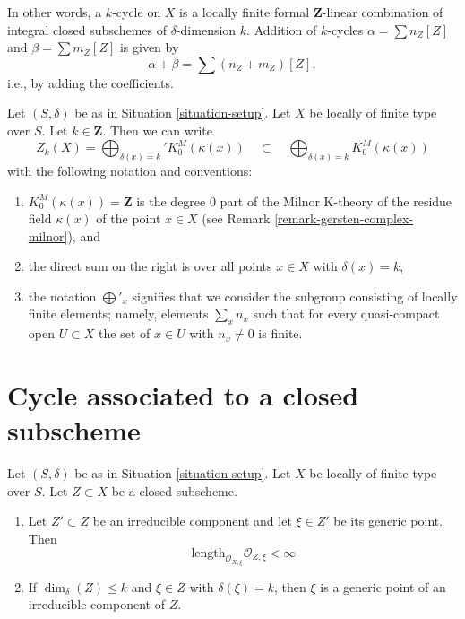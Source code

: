 \noindent
In other words, a $k$-cycle on $X$
is a locally finite formal $\mathbf{Z}$-linear
combination of integral closed subschemes of $\delta$-dimension $k$.
Addition of $k$-cycles $\alpha = \sum n_Z[Z]$ and
$\beta = \sum m_Z[Z]$ is given by
$$
\alpha + \beta = \sum (n_Z + m_Z)[Z],
$$
i.e., by adding the coefficients.

\begin{remark}
\label{remark-cycles-pointwise}
Let $(S, \delta)$ be as in Situation \ref{situation-setup}.
Let $X$ be locally of finite type over $S$. Let $k \in \mathbf{Z}$.
Then we can write
$$
Z_k(X) = \bigoplus\nolimits_{\delta(x) = k}' K_0^M(\kappa(x))
\quad\subset\quad
\bigoplus\nolimits_{\delta(x) = k} K_0^M(\kappa(x))
$$
with the following notation and conventions:
\begin{enumerate}
\item $K_0^M(\kappa(x)) = \mathbf{Z}$ is the degree $0$ part of
the Milnor K-theory of the residue field $\kappa(x)$ of the point
$x \in X$ (see Remark \ref{remark-gersten-complex-milnor}), and
\item the direct sum on the right is over all points $x \in X$
with $\delta(x) = k$,
\item the notation $\bigoplus'_x$ signifies that we consider the
subgroup consisting of locally finite elements; namely, elements
$\sum_x n_x$ such that for every quasi-compact open $U \subset X$
the set of $x \in U$ with $n_x \not = 0$ is finite.
\end{enumerate}
\end{remark}




\section{Cycle associated to a closed subscheme}
\label{section-cycle-of-closed-subscheme}

\begin{lemma}
\label{lemma-multiplicity-finite}
Let $(S, \delta)$ be as in Situation \ref{situation-setup}.
Let $X$ be locally of finite type over $S$.
Let $Z \subset X$ be a closed subscheme.
\begin{enumerate}
\item Let $Z' \subset Z$ be an irreducible component and
let $\xi \in Z'$ be its generic point.
Then
$$
\text{length}_{\mathcal{O}_{X, \xi}} \mathcal{O}_{Z, \xi} < \infty
$$
\item If $\dim_\delta(Z) \leq k$ and $\xi \in Z$ with
$\delta(\xi) = k$, then $\xi$ is a generic point of an
irreducible component of $Z$.
\end{enumerate}
\end{lemma}

